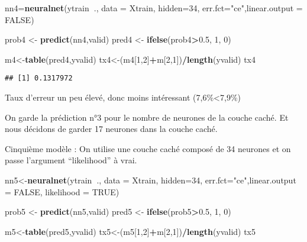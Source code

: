 \documentclass[
]{article}
\newenvironment{Shaded}{\begin{snugshade}}{\end{snugshade}}
\newcommand{\DataTypeTok}[1]{\textcolor[rgb]{0.13,0.29,0.53}{#1}}
\newcommand{\DecValTok}[1]{\textcolor[rgb]{0.00,0.00,0.81}{#1}}
\newcommand{\FloatTok}[1]{\textcolor[rgb]{0.00,0.00,0.81}{#1}}
\newcommand{\KeywordTok}[1]{\textcolor[rgb]{0.13,0.29,0.53}{\textbf{#1}}}
\newcommand{\NormalTok}[1]{#1}
\newcommand{\OperatorTok}[1]{\textcolor[rgb]{0.81,0.36,0.00}{\textbf{#1}}}
\newcommand{\OtherTok}[1]{\textcolor[rgb]{0.56,0.35,0.01}{#1}}
\newcommand{\StringTok}[1]{\textcolor[rgb]{0.31,0.60,0.02}{#1}}
\begin{document}
\begin{Shaded}
\begin{Highlighting}[]
\NormalTok{nn4=}\KeywordTok{neuralnet}\NormalTok{(ytrain}\OperatorTok{~}\NormalTok{., }\DataTypeTok{data =}\NormalTok{ Xtrain, }\DataTypeTok{hidden=}\DecValTok{34}\NormalTok{, }\DataTypeTok{err.fct=}\StringTok{"ce"}\NormalTok{,}\DataTypeTok{linear.output =} \OtherTok{FALSE}\NormalTok{)}

\NormalTok{prob4 <-}\StringTok{ }\KeywordTok{predict}\NormalTok{(nn4,valid)}
\NormalTok{pred4 <-}\StringTok{ }\KeywordTok{ifelse}\NormalTok{(prob4}\OperatorTok{>}\FloatTok{0.5}\NormalTok{, }\DecValTok{1}\NormalTok{, }\DecValTok{0}\NormalTok{)}

\NormalTok{m4<-}\KeywordTok{table}\NormalTok{(pred4,yvalid)}
\NormalTok{tx4<-(m4[}\DecValTok{1}\NormalTok{,}\DecValTok{2}\NormalTok{]}\OperatorTok{+}\NormalTok{m[}\DecValTok{2}\NormalTok{,}\DecValTok{1}\NormalTok{])}\OperatorTok{/}\KeywordTok{length}\NormalTok{(yvalid)}
\NormalTok{tx4}
\end{Highlighting}
\end{Shaded}

\begin{verbatim}
## [1] 0.1317972
\end{verbatim}

Taux d'erreur un peu élevé, donc moins intéressant (7,6\%\textless7,9\%)

On garde la prédiction n°3 pour le nombre de neurones de la couche
caché. Et nous décidons de garder 17 neurones dans la couche caché.

Cinquième modèle : On utilise une couche caché composé de 34 neurones et
on passe l'argument ``likelihood'' à vrai.

\begin{Shaded}
\begin{Highlighting}[]
\NormalTok{nn5<-}\KeywordTok{neuralnet}\NormalTok{(ytrain}\OperatorTok{~}\NormalTok{., }\DataTypeTok{data =}\NormalTok{ Xtrain, }\DataTypeTok{hidden=}\DecValTok{34}\NormalTok{, }\DataTypeTok{err.fct=}\StringTok{"ce"}\NormalTok{,}\DataTypeTok{linear.output =} \OtherTok{FALSE}\NormalTok{, }\DataTypeTok{likelihood =} \OtherTok{TRUE}\NormalTok{)}

\NormalTok{prob5 <-}\StringTok{ }\KeywordTok{predict}\NormalTok{(nn5,valid)}
\NormalTok{pred5 <-}\StringTok{ }\KeywordTok{ifelse}\NormalTok{(prob5}\OperatorTok{>}\FloatTok{0.5}\NormalTok{, }\DecValTok{1}\NormalTok{, }\DecValTok{0}\NormalTok{)}

\NormalTok{m5<-}\KeywordTok{table}\NormalTok{(pred5,yvalid)}
\NormalTok{tx5<-(m5[}\DecValTok{1}\NormalTok{,}\DecValTok{2}\NormalTok{]}\OperatorTok{+}\NormalTok{m[}\DecValTok{2}\NormalTok{,}\DecValTok{1}\NormalTok{])}\OperatorTok{/}\KeywordTok{length}\NormalTok{(yvalid)}
\NormalTok{tx5}
\end{Highlighting}
\end{Shaded}
\end{document}
